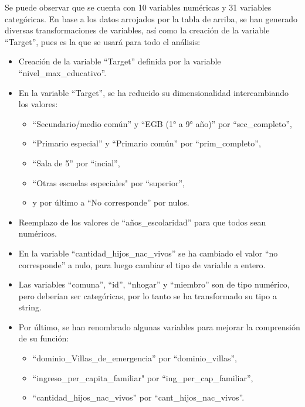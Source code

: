 \documentclass[a4paper]{article}
\begin{document}
    Se puede observar que se cuenta con 10 variables numéricas y 31 variables categóricas. 
    En base a los datos arrojados por la tabla de arriba, se han generado diversas transformaciones de variables, así como la creación de la variable ``Target'', pues es la que se usará para todo el análisis:
    \begin{itemize}
        \item Creación de la variable ``Target'' definida por la variable ``nivel\_max\_educativo''.
        \item En la variable ``Target'', se ha reducido su dimensionalidad intercambiando los valores:
            \begin{itemize}
                \item ``Secundario/medio común'' y ``EGB (1° a 9° año)'' por ``sec\_completo'',
                \item ``Primario especial'' y ``Primario común'' por ``prim\_completo'',
                \item ``Sala de 5'' por ``incial'',
                \item ``Otras escuelas especiales" por ``superior'',
                \item y por último a ``No corresponde'' por nulos.
            \end{itemize}
        \item Reemplazo de los valores de ``años\_escolaridad'' para que todos sean numéricos.
        \item En la variable ``cantidad\_hijos\_nac\_vivos'' se ha cambiado el valor ``no corresponde'' a nulo, para luego cambiar el tipo de variable a entero.
        \item Las variables ``comuna'', ``id'', ``nhogar'' y ``miembro'' son de tipo numérico, pero deberían ser categóricas, por lo tanto se ha transformado su tipo a string.
        \item Por último, se han renombrado algunas variables para mejorar la comprensión de su función:
            \begin{itemize}
                \item ``dominio\_Villas\_de\_emergencia'' por ``dominio\_villas'',
                \item ``ingreso\_per\_capita\_familiar" por ``ing\_per\_cap\_familiar'',
                \item ``cantidad\_hijos\_nac\_vivos'' por ``cant\_hijos\_nac\_vivos''.
            \end{itemize}
    \end{itemize}
\end{document}
